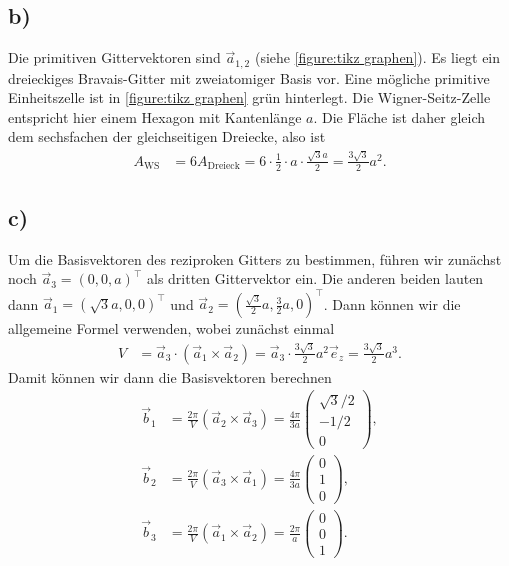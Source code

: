 \documentclass[english, parskip=full]{scrartcl}
\newcommand{\kla}{}
\newcommand{\tecxt}{}
\begin{document}
\subsection*{b)}
Die primitiven Gittervektoren sind $\vec{a}_{1,2}$ (siehe \autoref{figure:tikz graphen}).
Es liegt ein dreieckiges Bravais-Gitter mit zweiatomiger Basis vor. 
Eine mögliche primitive Einheitszelle ist in \autoref{figure:tikz graphen} grün hinterlegt.
Die Wigner-Seitz-Zelle entspricht hier einem Hexagon mit Kantenlänge $a$.
Die Fläche ist daher gleich dem sechsfachen der gleichseitigen Dreiecke, also ist 
\begin{align}
A_\tecxt\text{WS} &= 6A_\tecxt\text{Dreieck} = 6\cdot \frac{1}{2} \cdot a \cdot \frac{\sqrt{3}a}{2} = \frac{3\sqrt{3}}{2}a^2.
\end{align}

\subsection*{c)}
Um die Basisvektoren des reziproken Gitters zu bestimmen, führen wir zunächst noch $\vec{a}_3 = (0,0,a)^\top$ als dritten Gittervektor ein.
Die anderen beiden lauten dann $\vec{a}_1 = (\sqrt{3}a,0,0)^\top$ und $\vec{a}_2 = (\frac{\sqrt{3}}{2}a,\frac{3}{2}a,0)^\top$.
Dann können wir die allgemeine Formel verwenden, wobei zunächst einmal
\begin{align}
V &= \vec{a}_3\cdot \kla\left( \vec{a}_1\times\vec{a}_2 \right) = \vec{a}_3 \cdot \frac{3\sqrt{3}}{2} a^2\vec{e}_z = \frac{3\sqrt{3}}{2}a^3.
\end{align}
Damit können wir dann die Basisvektoren berechnen
\begin{align}
\vec{b}_1 &= \frac{2\pi}{V} (\vec{a}_2\times\vec{a}_3) = \frac{4\pi}{3a}  \begin{pmatrix}
\sqrt{3}/2 \\ -1/2 \\ 0
\end{pmatrix},\\
\vec{b}_2 &= \frac{2\pi}{V} (\vec{a}_3\times\vec{a}_1) = \frac{4\pi}{3a}  \begin{pmatrix}
0 \\ 1 \\ 0
\end{pmatrix},\\
\vec{b}_3 &= \frac{2\pi}{V} (\vec{a}_1\times\vec{a}_2) = \frac{2\pi}{a}  \begin{pmatrix}
0 \\ 0 \\ 1
\end{pmatrix}.
\end{align}
\end{document}
